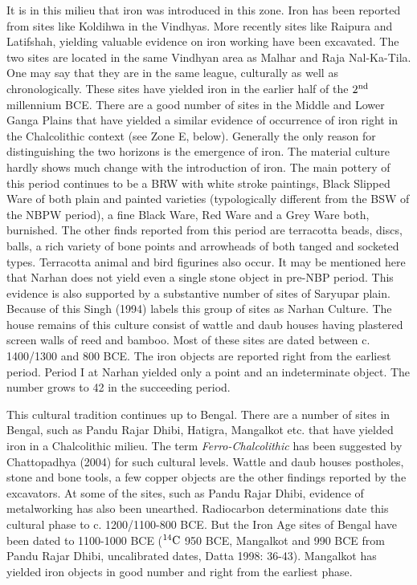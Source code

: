 It is in this milieu that iron was introduced in this zone. Iron has been reported from sites like Koldihwa in the Vindhyas. More recently sites like Raipura and Latifshah, yielding valuable evidence on iron working  have been excavated. The two sites are located in the same Vindhyan area as Malhar and Raja Nal-Ka-Tila. One may say that they are in the same league, culturally as well as chronologically. These sites have yielded iron in the earlier half of the $2^{\rm nd}$ millennium BCE. There are a good number of sites in the Middle and Lower Ganga Plains that have yielded a similar evidence of occurrence of iron right in the Chalcolithic context (see Zone E, below). Generally the only reason for distinguishing the two horizons is the emergence of iron. The material culture hardly shows much change with the introduction of iron. The main pottery of this period continues to be a BRW with white stroke paintings, Black Slipped Ware of both plain and painted varieties (typologically different from the BSW of the NBPW period), a fine Black Ware, Red Ware and a Grey Ware both, burnished.  The other finds reported from this period are terracotta beads, discs, balls, a rich variety of bone points and arrowheads of both tanged and socketed types. Terracotta animal and bird figurines also occur. It may be mentioned here that Narhan does not yield even a single stone object in pre-NBP period. This evidence is also supported by a substantive number of sites of Saryupar plain. Because of this Singh (1994) labels this group of sites as Narhan Culture. The house remains of this culture consist of wattle and daub houses having plastered screen walls of reed and bamboo. Most of these sites are dated between c. 1400/1300 and 800 BCE.  The iron objects are reported right from the earliest period. Period I at Narhan yielded only a point and an indeterminate object. The number grows to 42 in the succeeding period. 

This cultural tradition continues up to Bengal. There are a number of sites in Bengal, such as Pandu Rajar Dhibi, Hatigra, Mangalkot etc. that have yielded iron in a Chalcolithic milieu. The term \textit{Ferro-Chalcolithic} has been suggested by Chattopadhya (2004) for such cultural levels. Wattle and daub houses postholes, stone and bone tools, a few copper objects are the other findings reported by the excavators. At some of the sites, such as Pandu Rajar Dhibi, evidence of metalworking has also been unearthed. Radiocarbon determinations date this cultural phase to c. 1200/1100-800 BCE. But the Iron Age sites of Bengal have been dated to 1100-1000 BCE ($^{14}{\rm C}$ 950 BCE, Mangalkot and 990 BCE from Pandu Rajar Dhibi, uncalibrated dates, Datta 1998: 36-43). Mangalkot has yielded iron objects in good number and right from the earliest phase. 

